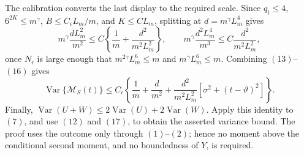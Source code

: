 The calibration converts the last display to the required scale.  Since \(q_t\le4\), \(6^{2K}\le m^{\gamma}\), \(B\le C_{\epsilon}L_m/m\), and \(K\le C L_m\), splitting at \(d=m^{\gamma}L_m^4\) gives
\[
 m^{\gamma}\frac{dL_m^2}{m^2}
 \le C\left\{\frac1m+\frac{d^2}{m^2L_m^2}\right\},
 \qquad
 m^{\gamma}\frac{d^2L_m^4}{m^3}
 \le C\frac{d^2}{m^2L_m^2},
\tag{16}
\]
once \(N_{\epsilon}\) is large enough that \(m^{2\gamma}L_m^6\le m\) and \(m^{\gamma}L_m^6\le m\).  Combining \((13)\)--\((16)\) gives
\[
 \operatorname{Var}\{\mathcal M_S(t)\}
 \le C_{\epsilon}\left\{
 \frac1m+\frac d{m^2}
 +\frac{d^2}{m^2L_m^2}
 [\sigma^2+(t-\vartheta)^2]
 \right\}.
\tag{17}
\]
Finally, \(\operatorname{Var}(U+W)\le2\operatorname{Var}(U)+2\operatorname{Var}(W)\).  Apply this identity to \((7)\), and use \((12)\) and \((17)\), to obtain the asserted variance bound.  The proof uses the outcome only through \((1)\)--\((2)\); hence no moment above the conditional second moment, and no boundedness of \(Y\), is required.